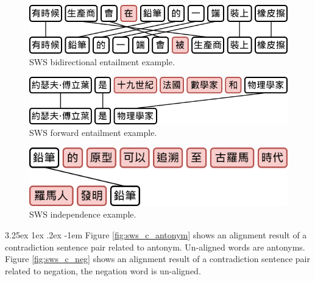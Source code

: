 \documentclass[12pt]{article}
\makeatletter
\renewcommand\paragraph{\@startsection{paragraph}{5}{\z@}%
  {3.25ex \@plus1ex \@minus.2ex}%
  {-1em}%
  {\normalfont\normalsize\bfseries}}
\makeatother
\begin{document}
\begin{CJK*}{UTF8}{bkai}
\begin{spacing}{1.77}
\hspace*{-1.5in}
\begin{figure}[H]
  \centering
  \includegraphics[scale=0.6]{SWS.B.png}
  \caption[SWS Bidirectional Entailment Example]{SWS bidirectional entailment example.}
  \label{fig:sws_b}
\end{figure}

\hspace*{-1.5in}
\begin{figure}[H]
  \centering
  \includegraphics[scale=0.6]{SWS.F.png}
  \caption[SWS Forward Entailment Example]{SWS forward entailment example.}
  \label{fig:sws_f}
\end{figure}

\hspace*{-1.5in}
\begin{figure}[H]
  \centering
  \includegraphics[scale=0.6]{SWS.I.png}
  \caption[SWS Independence Example]{SWS independence example.}
  \label{fig:sws_i}
\end{figure}

\paragraph{}
Figure \ref{fig:sws_c_antonym} shows an alignment result of a contradiction sentence pair related to antonym. Un-aligned words are antonyms. Figure \ref{fig:sws_c_neg} shows an alignment result of a contradiction sentence pair related to negation, the negation word is un-aligned.


\end{spacing}
\end{CJK*}
\end{document}
